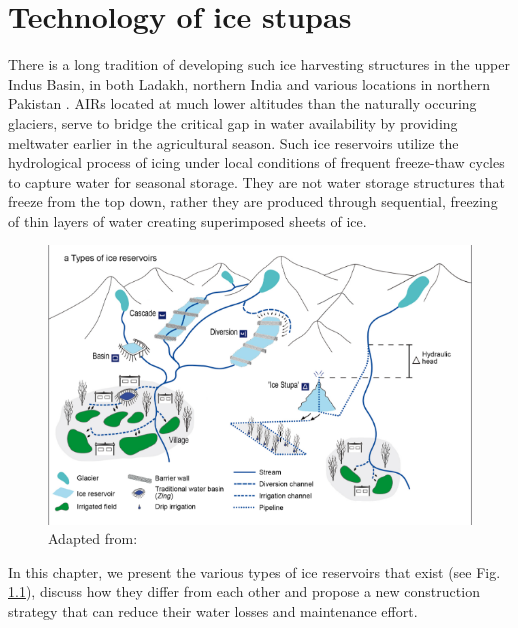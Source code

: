 \chapter{Technology of ice stupas}
\label{chap:tech}


There is a long tradition of developing such ice harvesting structures in the upper Indus Basin, in both Ladakh,
northern India \citep{labbalTraditionalOasesLadakh2000, nusserIrrigationDevelopmentUpper2012} and various
locations in northern Pakistan \citep{kreutzmannScarcityOpulenceWater2011}. AIRs located at much lower altitudes
than the naturally occuring glaciers, serve to bridge the critical gap in water availability by providing
meltwater earlier in the agricultural season. Such ice reservoirs utilize the hydrological process of icing
under local conditions of frequent freeze-thaw cycles to capture water for seasonal storage. They are not water
storage structures that freeze from the top down, rather they are produced through sequential, freezing of thin
layers of water creating superimposed sheets of ice.

\begin{figure}[htb]
\centering
\includegraphics[width=12cm]{figs/AIR_designs}
\caption{ Adapted from: \cite{nusserSociohydrologyArtificialGlaciers2019}}
\label{fig:AIRdesigns}
\end{figure}

In this chapter, we present the various types of ice reservoirs that exist (see Fig. \ref{fig:AIRdesigns}), discuss
how they differ from each other and propose a new construction strategy that can reduce their water losses and
maintenance effort. 

